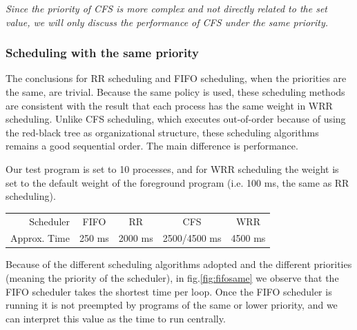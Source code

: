 \documentclass[11pt]{article}
\begin{document}
\emph{Since the priority of CFS is more complex
and not directly related to the set value, we will only discuss the
performance of CFS under the same priority.}

\subsubsection{Scheduling with the same priority}

The conclusions for RR scheduling and FIFO scheduling, when the
priorities are the same, are trivial. Because the same policy is used,
these scheduling methods are consistent with the result that each
process has the same weight in WRR scheduling. Unlike CFS scheduling,
which executes out-of-order because of using the red-black tree as
organizational structure, these scheduling algorithms remains a good
sequential order. The main difference is performance.

Our test program is set to 10 processes, and for WRR scheduling the
weight is set to the default weight of the foreground program (i.e. 100
ms, the same as RR scheduling).

\begin{table}[H]
  \centering
  \begin{tabular}{r|cccc}
    \hline
Scheduler & FIFO & RR & CFS & WRR \\
Approx. Time & 250 ms & 2000 ms & 2500/4500 ms & 4500 ms \\\hline
\end{tabular}
\end{table}

Because of the different scheduling algorithms adopted and the different
priorities (meaning the priority of the scheduler), in fig.\ref{fig:fifosame} 
we observe that the
FIFO scheduler takes the shortest time per loop. Once the FIFO scheduler
is running it is not preempted by programs of the same or lower
priority, and we can interpret this value as the time to run centrally.
\end{document}
